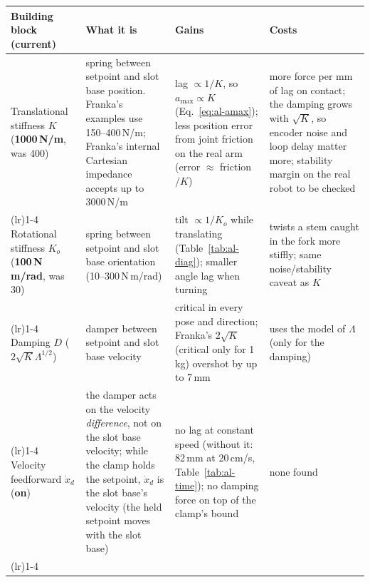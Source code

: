 \begin{center}
{\small\renewcommand{\arraystretch}{1.2}
\begin{tabular}{>{\raggedright\arraybackslash}p{}>{\raggedright\arraybackslash}p{}>{\raggedright\arraybackslash}p{}>{\raggedright\arraybackslash}p{}}
  \toprule
  Building block (current) & What it is & Gains & Costs \\
  \midrule
  Translational stiffness $K$ \newline (\textbf{1000\,N/m}, was 400)
    & spring between setpoint and slot base position. Franka's examples use 150--400\,N/m; Franka's internal Cartesian
      impedance accepts up to 3000\,N/m
    & lag $\propto 1/K$, so $a_\text{max} \propto K$ (Eq.~\ref{eq:al-amax}); less position error from joint friction on
      the real arm (error $\approx$ friction$/K$)
    & more force per mm of lag on contact; the damping grows with $\sqrt K$, so encoder noise and loop delay matter
      more; stability margin on the real robot to be checked \\
  \addlinespace\cmidrule(lr){1-4}\addlinespace
  Rotational stiffness $K_o$ \newline (\textbf{100\,N\,m/rad}, was 30)
    & spring between setpoint and slot base orientation (10--300\,N\,m/rad)
    & tilt $\propto 1/K_o$ while translating (Table~\ref{tab:al-diag}); smaller angle lag when turning
    & twists a stem caught in the fork more stiffly; same noise/stability caveat as $K$ \\
  \addlinespace\cmidrule(lr){1-4}\addlinespace
  Damping $D$ \newline (\textbf{$2\sqrt K\Lambda^{1/2}$})
    & damper between setpoint and slot base velocity
    & critical in every pose and direction; Franka's $2\sqrt K$ (critical only for 1\,kg) overshot by up to 7\,mm
    & uses the model of $\Lambda$ (only for the damping) \\
  \addlinespace\cmidrule(lr){1-4}\addlinespace
  Velocity feedforward $\dot x_d$ \newline (\textbf{on})
    & the damper acts on the velocity \emph{difference}, not on the slot base velocity; while the clamp holds the setpoint,
      $\dot x_d$ is the slot base's velocity (the held setpoint moves with the slot base)
    & no lag at constant speed (without it: 82\,mm at 20\,cm/s, Table~\ref{tab:al-time}); no damping force on top of
      the clamp's bound
    & none found \\
  \addlinespace\cmidrule(lr){1-4}\addlinespace

\end{tabular}}
\end{center}
